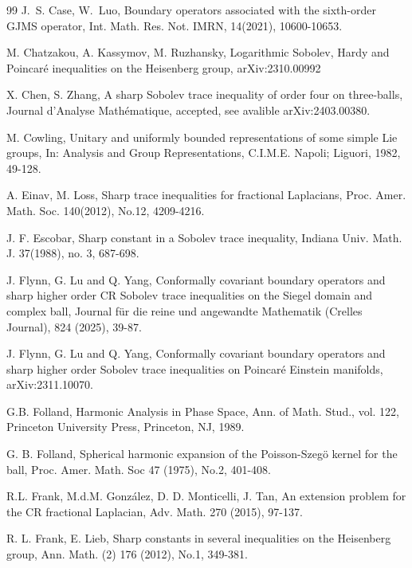 \documentclass[12pt,reqno]{amsart}%
\theoremstyle{plain}
\numberwithin{equation}{section}
\begin{document}
\begin{thebibliography}{99}
J.~S. Case,  W.~Luo,
 Boundary operators associated with the sixth-order GJMS operator,
 Int. Math. Res. Not. IMRN, 14(2021), 10600-10653.

 M. Chatzakou, A. Kassymov, M. Ruzhansky,  Logarithmic Sobolev, Hardy and Poincar\'e inequalities on
the Heisenberg group, arXiv:2310.00992

  X. Chen, S. Zhang,  A sharp Sobolev trace inequality of order four on three-balls,  Journal d'Analyse Math\'ematique, accepted, see avalible  arXiv:2403.00380.

  M. Cowling, Unitary and uniformly bounded representations of some simple Lie groups,
In: Analysis and Group Representations, C.I.M.E. Napoli; Liguori, 1982, 49-128.

 A. Einav, M. Loss, Sharp trace inequalities for fractional Laplacians, Proc. Amer. Math. Soc.  140(2012), No.12, 4209-4216.

 J. F.  Escobar,  Sharp constant in a Sobolev trace inequality,  Indiana Univ. Math. J. 37(1988), no. 3, 687-698.

 J. Flynn, G. Lu and Q. Yang, Conformally covariant boundary operators and sharp higher order CR Sobolev trace inequalities on the Siegel domain and complex ball, Journal f\"ur die reine und angewandte Mathematik (Crelles Journal), 824 (2025), 39-87.

J. Flynn, G. Lu and Q. Yang, Conformally covariant boundary operators and sharp higher order Sobolev trace inequalities on Poincar\'e Einstein manifolds, arXiv:2311.10070.



  G.B. Folland, Harmonic Analysis in Phase Space, Ann. of Math. Stud., vol. 122, Princeton University Press, Princeton, NJ, 1989.










G. B. Folland, Spherical harmonic expansion of the Poisson-Szeg\"o kernel for the ball,
Proc. Amer. Math. Soc 47 (1975), No.2, 401-408.


 R.L. Frank, M.d.M. Gonz\'alez, D. D. Monticelli, J. Tan, An extension problem for the CR fractional
Laplacian, Adv. Math. 270 (2015), 97-137.

 R. L. Frank, E. Lieb, Sharp constants in several inequalities on the Heisenberg group, Ann.
 Math. (2) 176 (2012), No.1, 349-381.




\end{thebibliography}
\end{document}
